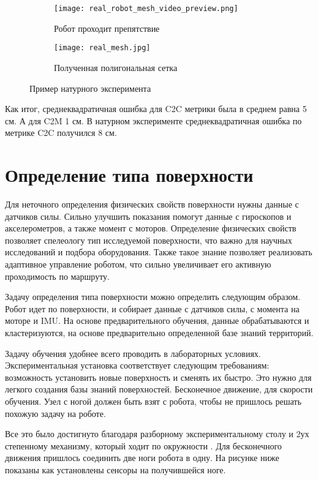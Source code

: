 \begin{figure}[H]
    \begin{subfigure}[t]{0.49\textwidth}
        \centering\texttt{[image: real\_robot\_mesh\_video\_preview.png]}
        \caption{Робот проходит препятствие}
        \label{fig:real_robot_mesh_video_preview.png}
    \end{subfigure}
    \begin{subfigure}[t]{0.49\textwidth}
        \centering\texttt{[image: real\_mesh.jpg]}
        \caption{Полученная полигональная сетка}
        \label{fig:real_mesh.jpg}
    \end{subfigure}
    \caption{Пример натурного эксперимента}
    \label{fig:real_exp_map_creation}
\end{figure}

Как итог, среднеквадратичная ошибка для C2C метрики была в среднем равна 5 см. А для C2M 1 см. В натурном эксперименте среднеквадратичная ошибка по метрике C2C получился 8 см.

\section{Определение типа поверхности}
Для неточного определения физических свойств поверхности нужны данные с датчиков силы. Сильно улучшить показания помогут данные с гироскопов и акселерометров, а также момент с моторов. Определение физических свойств позволяет спелеологу тип исследуемой поверхности, что важно для научных исследований и подбора оборудования. Также такое знание позволяет реализовать адаптивное управление роботом, что сильно увеличивает его активную проходимость по маршруту.

Задачу определения типа поверхности можно определить следующим образом. Робот идет по поверхности, и собирает данные с датчиков силы, с момента на моторе и IMU. На основе предварительного обучения, данные обрабатываются и кластеризуются, на основе предварительно определенной базе знаний территорий.

Задачу обучения удобнее всего проводить в лабораторных условиях. Экспериментальная установка соответствует следующим требованиям: возможность установить новые поверхность и сменять их быстро. Это нужно для легкого создания базы знаний поверхностей. Бесконечное движение, для скорости обучения. Узел с ногой должен быть взят с робота, чтобы не пришлось решать похожую задачу на роботе.

Все это было достигнуто благодаря разборному экспериментальному столу и 2ух степенному механизму, который ходит по окружности . Для бесконечного движения пришлось соединить две ноги робота в одну. На рисунке ниже  показаны как установлены сенсоры на получившейся ноге.

